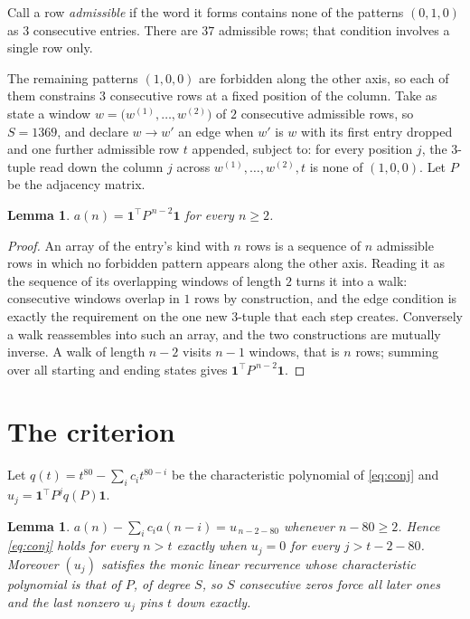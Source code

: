 \documentclass[11pt,a4paper]{article}
\theoremstyle{plain}
\newtheorem{lemma}[theorem]{Lemma}
\theoremstyle{definition}
\begin{document}
Call a row \emph{admissible} if the word it forms contains none of the patterns
$(0,1,0)$ as $3$ consecutive entries. There are $37$ admissible rows; that condition
involves a single row only.

The remaining patterns $(1,0,0)$ are forbidden along the other axis, so each of them
constrains $3$ consecutive rows at a fixed position of the column. Take as state a
window $w=\bigl(w^{(1)},\dots,w^{(2)}\bigr)$ of $2$ consecutive admissible
rows, so $S=1369$, and declare $w\to w'$ an edge when $w'$ is $w$ with its first entry
dropped and one further admissible row $t$ appended, subject to: for every position
$j$, the $3$-tuple read down the column $j$ across $w^{(1)},\dots,w^{(2)},t$
is none of $(1,0,0)$. Let $P$ be the adjacency matrix.

\begin{lemma}\label{lem:walk}
$a(n)=\mathbf{1}^{\!\top}P^{\,n-2}\mathbf{1}$ for every $n\ge2$.
\end{lemma}

\begin{proof}
An array of the entry's kind with $n$ rows is a sequence of $n$ admissible rows in
which no forbidden pattern appears along the other axis. Reading it as the sequence of its
overlapping windows of length $2$ turns it into a walk: consecutive windows overlap in
$1$ rows by construction, and the edge condition is exactly the requirement on the one
new $3$-tuple that each step creates. Conversely a walk reassembles into such an array,
and the two constructions are mutually inverse. A walk of length $n-2$ visits $n-1$
windows, that is $n$ rows; summing over all starting and ending states gives
$\mathbf{1}^{\!\top}P^{\,n-2}\mathbf{1}$.
\end{proof}

\section{The criterion}

Let $q(t)=t^{80}-\sum_i c_i t^{80-i}$ be the characteristic polynomial of
\eqref{eq:conj} and $u_j=\mathbf{1}^{\!\top}P^{j}q(P)\mathbf{1}$.

\begin{lemma}\label{lem:crit}
$a(n)-\sum_i c_i a(n-i)=u_{\,n-2-80}$ whenever $n-80\ge2$. Hence
\eqref{eq:conj} holds for every $n>t$ exactly when $u_j=0$ for every
$j>t-2-80$. Moreover $(u_j)$ satisfies the monic linear recurrence whose
characteristic polynomial is that of $P$, of degree $S$, so $S$ consecutive zeros force all
later ones and the last nonzero $u_j$ pins $t$ down exactly.
\end{lemma}
\end{document}
